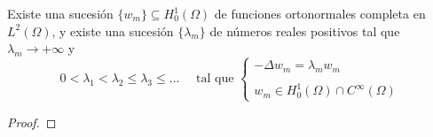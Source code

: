 \begin{teo}
    Existe una sucesión $\{w_m\} \subseteq H_0^1(\Omega)$ de funciones ortonormales completa en $L^2(\Omega)$, y existe una sucesión $\{\lambda_m\}$ de números reales positivos tal que $\lambda_m \longrightarrow +\infty$ y
    \begin{equation*}
        0 < \lambda_1 < \lambda_2 \leq \lambda_3 \leq \dots \quad \text{ tal que } \begin{cases} -\Delta w_m = \lambda_m w_m \\ \\ w_m \in H_0^1(\Omega) \cap C^\infty(\Omega) \end{cases}
    \end{equation*}
\begin{proof} %













\end{proof}
\end{teo}
